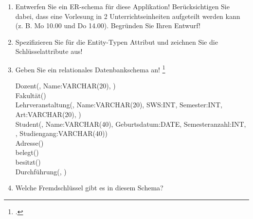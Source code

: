 \documentclass{bschlangaul-aufgabe}
\begin{document}
\begin{enumerate}


\item Entwerfen Sie ein ER-schema für diese Applikation!
Berücksichtigen Sie dabei, dass eine Vorlesung in 2
Unterrichtseinheiten aufgeteilt werden kann (z. B. Mo 10.00 und Do
14.00). Begründen Sie Ihren Entwurf!


\item Spezifizieren Sie für die Entity-Typen Attribut und zeichnen Sie
die Schlüsselattribute aus!


\item Geben Sie ein relationales Datenbankschema an!
\footcite[Uni-ER-Modell, Aufgabe 2]{db:ab:4}

\begin{liAntwort}
\ttfamily
\footnotesize
Dozent(, Name:VARCHAR(20),
)\\

Fakultät()\\

Lehrveranstaltung(, Name:VARCHAR(20), SWS:INT,
Semester:INT, Art:VARCHAR(20), )\\

Student(, Name:VARCHAR(40), Geburtsdatum:DATE,
Semesteranzahl:INT, ,
Studiengang:VARCHAR(40))\\

Adresse()\\

belegt()\\

besitzt()\\

Durchführung(, )\\
\end{liAntwort}

\item Welche Fremdschlüssel gibt es in diesem Schema?
\end{enumerate}
\end{document}
